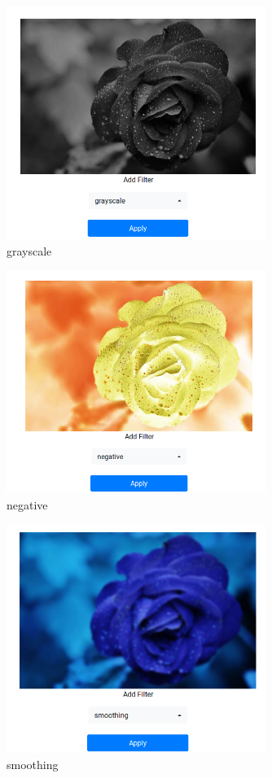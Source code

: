 \documentclass{article}
\begin{document}
  \begin{figure}[!htb]
    \centering
    \includegraphics[width=0.75\textwidth]{assets/grayscale.png}
    \caption{grayscale}
    \label{fig:grayscale}
  \end{figure}

  \begin{figure}[!htb]
    \centering
    \includegraphics[width=0.75\textwidth]{assets/negative.png}
    \caption{negative}
    \label{fig:negative}
  \end{figure}

  \begin{figure}[!htb]
    \centering
    \includegraphics[width=0.75\textwidth]{assets/smoothing.png}
    \caption{smoothing}
    \label{fig:smoothing}
  \end{figure}
\end{document}
